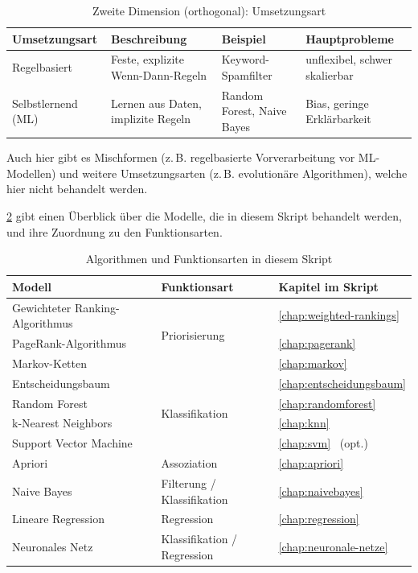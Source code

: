 \begin{table}[H]
\centering
\small
\begin{tabular}{p{3.0cm}p{5.1cm}p{2.5cm}p{3.0cm}}
\toprule
\textbf{Umsetzungsart} & \textbf{Beschreibung} & \textbf{Beispiel} & \textbf{Hauptprobleme} \\
\midrule
Regelbasiert & Feste, explizite Wenn-Dann-Regeln & Keyword-Spamfilter & unflexibel, schwer skalierbar \\
\midrule
Selbstlernend (ML) & Lernen aus Daten, implizite Regeln & Random Forest, Naive Bayes & Bias, geringe Erklärbarkeit \\
\bottomrule
\end{tabular}
\caption{Zweite Dimension (orthogonal): Umsetzungsart}
\label{tab:algorithmus-umsetzungsarten-15}
\end{table}

Auch hier gibt es Mischformen (z.\,B. regelbasierte Vorverarbeitung vor ML-Modellen) und weitere Umsetzungsarten (z.\,B. evolutionäre Algorithmen), welche hier nicht behandelt werden.

\cref{tab:modelle-uebersicht-15} gibt einen Überblick über die Modelle, die in diesem Skript behandelt werden, und ihre Zuordnung zu den Funktionsarten.

\begin{table}[H]
\centering
\small
\begin{tabular}{lp{2.4cm}l}
\toprule
\textbf{Modell} & \textbf{Funktionsart} & \textbf{Kapitel im Skript} \\
\midrule
Gewichteter Ranking-Algorithmus & \multirow{3}{*}{Priorisierung} & \cref{chap:weighted-rankings}\\
PageRank-Algorithmus &  & \cref{chap:pagerank}\\
Markov-Ketten &  & \cref{chap:markov} \\\midrule
Entscheidungsbaum & \multirow{4}{*}{Klassifikation} & \cref{chap:entscheidungsbaum} \\
Random Forest &  & \cref{chap:randomforest} \\
k-Nearest Neighbors &  & \cref{chap:knn} \\
Support Vector Machine &  & \cref{chap:svm} \, (opt.) \\\midrule
Apriori & Assoziation & \cref{chap:apriori} \\\midrule
Naive Bayes & Filterung / Klassifikation & \cref{chap:naivebayes} \\\midrule
Lineare Regression & Regression & \cref{chap:regression} \\\midrule
Neuronales Netz & Klassifikation / Regression & \cref{chap:neuronale-netze}\\
\bottomrule
\end{tabular}
\caption{Algorithmen und Funktionsarten in diesem Skript}
\label{tab:modelle-uebersicht-15}
\end{table}

